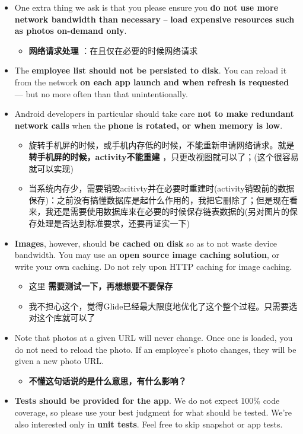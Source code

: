 \documentclass[9pt, b5paper]{article}
\begin{document}
\begin{itemize}
\item One extra thing we ask is that you please ensure you \textbf{do not use more network bandwidth than necessary} – \textbf{load expensive resources such as photos on-demand only}.
\begin{itemize}
\item \textbf{网络请求处理} ：在且仅在必要的时候网络请求
\end{itemize}
\item The \textbf{employee list should not be persisted to disk}. You can reload it from the network \textbf{on each app launch and when refresh is requested} — but no more often than that unintentionally.
\item Android developers in particular should take care \textbf{not to make redundant network calls} when the \textbf{phone is rotated, or when memory is low}.
\begin{itemize}
\item 旋转手机屏的时候，或手机内存低的时候，不能重新申请网络请求。就是 \textbf{转手机屏的时候，activity不能重建} ，只更改视图就可以了；(这个很容易就可以实现)
\item 当系统内存少，需要销毁acitivty并在必要时重建时(activity销毁前的数据保存)：之前没有搞懂数据库是起什么作用的，我把它删除了；但是现在看来，我还是需要使用数据库来在必要的时候保存链表数据的(另对图片的保存处理是否达到标准要求，还要再证实一下)
\end{itemize}
\item \textbf{Images}, however, should \textbf{be cached on disk} so as to not waste device bandwidth. You may use an \textbf{open source image caching solution}, or write your own caching. Do not rely upon HTTP caching for image caching.
\begin{itemize}
\item 这里 \textbf{需要测试一下，再想想要不要保存}
\item 我不担心这个，觉得Glide已经最大限度地优化了这个整个过程。只需要选对这个库就可以了
\end{itemize}
\item Note that photos at a given URL will never change. Once one is loaded, you do not need to reload the photo. If an employee’s photo changes, they will be given a new photo URL.
\begin{itemize}
\item \textbf{不懂这句话说的是什么意思，有什么影响？}
\end{itemize}
\item \textbf{Tests should be provided for the app}. We do not expect 100\% code coverage, so please use your best judgment for what should be tested. We’re also interested only in \textbf{unit tests}. Feel free to skip snapshot or app tests.

\end{itemize}
\end{document}

